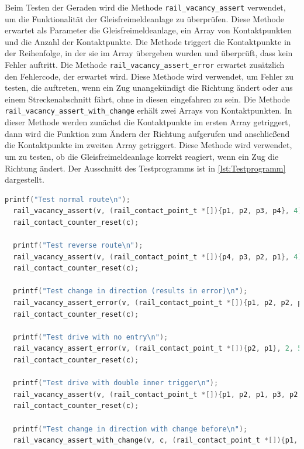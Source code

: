 Beim Testen der Geraden wird die Methode \texttt{rail\_vacancy\_assert} verwendet, um die Funktionalität der Gleisfreimeldeanlage zu überprüfen. Diese Methode erwartet als Parameter die Gleisfreimeldeanlage, ein Array von Kontaktpunkten und die Anzahl der Kontaktpunkte. Die Methode triggert die Kontaktpunkte in der Reihenfolge, in der sie im Array übergeben wurden und überprüft, dass kein Fehler auftritt.\newline
Die Methode \texttt{rail\_vacancy\_assert\_error} erwartet zusätzlich den Fehlercode, der erwartet wird. Diese Methode wird verwendet, um Fehler zu testen, die auftreten, wenn ein Zug unangekündigt die Richtung ändert oder aus einem Streckenabschnitt fährt, ohne in diesen eingefahren zu sein.\newline
Die Methode \texttt{rail\_vacancy\_assert\_with\_change} erhält zwei Arrays von Kontaktpunkten. In dieser Methode werden zunächst die Kontaktpunkte im ersten Array getriggert, dann wird die Funktion zum Ändern der Richtung aufgerufen und anschließend die Kontaktpunkte im zweiten Array getriggert. Diese Methode wird verwendet, um zu testen, ob die Gleisfreimeldeanlage korrekt reagiert, wenn ein Zug die Richtung ändert. Der Ausschnitt des Testprogramms ist in \autoref{lst:Testprogramm} dargestellt.

\begin{lstlisting}[caption={Ausschnitt des Testprogramms für Geraden},label={lst:Testprogramm},language=C]
  printf("Test normal route\n");
  rail_vacancy_assert(v, (rail_contact_point_t *[]){p1, p2, p3, p4}, 4);
  rail_contact_counter_reset(c);

  printf("Test reverse route\n");
  rail_vacancy_assert(v, (rail_contact_point_t *[]){p4, p3, p2, p1}, 4);
  rail_contact_counter_reset(c);

  printf("Test change in direction (results in error)\n");
  rail_vacancy_assert_error(v, (rail_contact_point_t *[]){p1, p2, p2, p1}, 4, 4);
  rail_contact_counter_reset(c);

  printf("Test drive with no entry\n");
  rail_vacancy_assert_error(v, (rail_contact_point_t *[]){p2, p1}, 2, 5);
  rail_contact_counter_reset(c);

  printf("Test drive with double inner trigger\n");
  rail_vacancy_assert(v, (rail_contact_point_t *[]){p1, p2, p1, p3, p2, p4, p3, p4}, 8);
  rail_contact_counter_reset(c);

  printf("Test change in direction with change before\n");
  rail_vacancy_assert_with_change(v, c, (rail_contact_point_t *[]){p1, p2, p1, p2}, 4, (rail_contact_point_t *[]){p2, p1, p2, p1}, 4);
\end{lstlisting}

